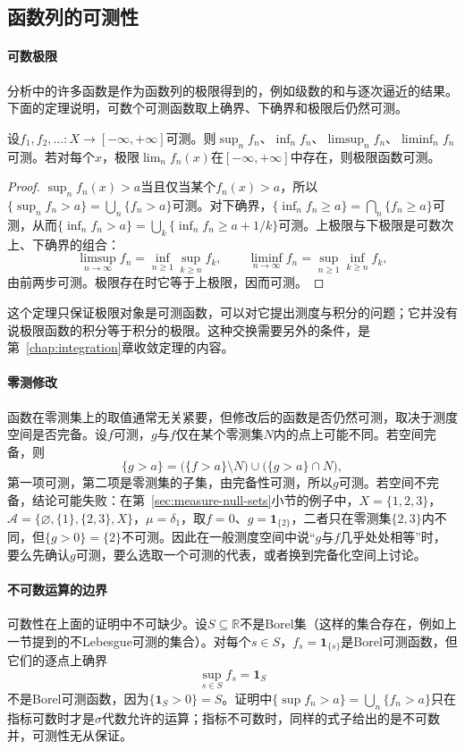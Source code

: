 \subsection{函数列的可测性}
\label{sec:measure-function-sequences}

\paragraph{可数极限}
分析中的许多函数是作为函数列的极限得到的，例如级数的和与逐次逼近的结果。下面的定理说明，可数个可测函数取上确界、下确界和极限后仍然可测。

\begin{theorem}[可数极限的可测性]
\label{thm:measure-limits}
设$f_1,f_2,\dots:X\to[-\infty,+\infty]$可测。则$\sup_nf_n$、$\inf_nf_n$、$\limsup_nf_n$、$\liminf_nf_n$可测。若对每个$x$，极限$\lim_nf_n(x)$在$[-\infty,+\infty]$中存在，则极限函数可测。
\end{theorem}

\begin{proof}
$\sup_nf_n(x)>a$当且仅当某个$f_n(x)>a$，所以$\{\sup_nf_n>a\}=\bigcup_n\{f_n>a\}$可测。对下确界，$\{\inf_nf_n\ge a\}=\bigcap_n\{f_n\ge a\}$可测，从而$\{\inf_nf_n>a\}=\bigcup_k\{\inf_nf_n\ge a+1/k\}$可测。上极限与下极限是可数次上、下确界的组合：
\[
 \limsup_{n\to\infty}f_n=\inf_{n\ge1}\sup_{k\ge n}f_k,\qquad \liminf_{n\to\infty}f_n=\sup_{n\ge1}\inf_{k\ge n}f_k,
\]
由前两步可测。极限存在时它等于上极限，因而可测。
\end{proof}

这个定理只保证极限对象是可测函数，可以对它提出测度与积分的问题；它并没有说极限函数的积分等于积分的极限。这种交换需要另外的条件，是第~\ref{chap:integration}章收敛定理的内容。

\paragraph{零测修改}
函数在零测集上的取值通常无关紧要，但修改后的函数是否仍然可测，取决于测度空间是否完备。设$f$可测，$g$与$f$仅在某个零测集$N$内的点上可能不同。若空间完备，则
\[
 \{g>a\}=\bigl(\{f>a\}\setminus N\bigr)\cup\bigl(\{g>a\}\cap N\bigr),
\]
第一项可测，第二项是零测集的子集，由完备性可测，所以$g$可测。若空间不完备，结论可能失败：在第~\ref{sec:measure-null-sets}小节的例子中，$X=\{1,2,3\}$，$\mathcal A=\{\varnothing,\{1\},\{2,3\},X\}$，$\mu=\delta_1$，取$f=0$、$g=\mathbf 1_{\{2\}}$，二者只在零测集$\{2,3\}$内不同，但$\{g>0\}=\{2\}$不可测。因此在一般测度空间中说“$g$与$f$几乎处处相等”时，要么先确认$g$可测，要么选取一个可测的代表，或者换到完备化空间上讨论。

\paragraph{不可数运算的边界}
可数性在上面的证明中不可缺少。设$S\subseteq\mathbb R$不是Borel集（这样的集合存在，例如上一节提到的不Lebesgue可测的集合）。对每个$s\in S$，$f_s=\mathbf 1_{\{s\}}$是Borel可测函数，但它们的逐点上确界
\[
 \sup_{s\in S}f_s=\mathbf 1_S
\]
不是Borel可测函数，因为$\{\mathbf 1_S>0\}=S$。证明中$\{\sup f_n>a\}=\bigcup_n\{f_n>a\}$只在指标可数时才是$\sigma$代数允许的运算；指标不可数时，同样的式子给出的是不可数并，可测性无从保证。
